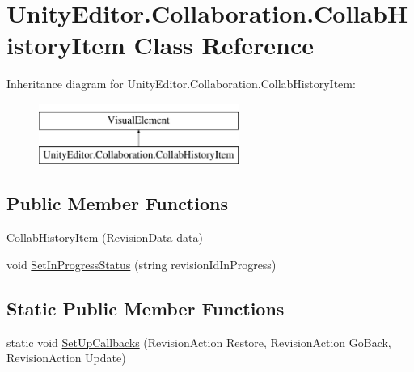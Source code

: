 \hypertarget{class_unity_editor_1_1_collaboration_1_1_collab_history_item}{}\section{Unity\+Editor.\+Collaboration.\+Collab\+History\+Item Class Reference}
\label{class_unity_editor_1_1_collaboration_1_1_collab_history_item}
Inheritance diagram for Unity\+Editor.\+Collaboration.\+Collab\+History\+Item\+:\begin{figure}[H]
\begin{center}
\leavevmode
\includegraphics[height=2.000000cm]{class_unity_editor_1_1_collaboration_1_1_collab_history_item}
\end{center}
\end{figure}
\subsection*{Public Member Functions}
\begin{DoxyCompactItemize}
\item 
\mbox{\hyperlink{class_unity_editor_1_1_collaboration_1_1_collab_history_item_a4f57052c02c99bd8d57e25fb7f33fc97}{Collab\+History\+Item}} (Revision\+Data data)
\item 
void \mbox{\hyperlink{class_unity_editor_1_1_collaboration_1_1_collab_history_item_aa341dac7ad719513071adcce064ad566}{Set\+In\+Progress\+Status}} (string revision\+Id\+In\+Progress)
\end{DoxyCompactItemize}
\subsection*{Static Public Member Functions}
\begin{DoxyCompactItemize}
\item 
static void \mbox{\hyperlink{class_unity_editor_1_1_collaboration_1_1_collab_history_item_a83f34e69f82829b893034e23379c1dc8}{Set\+Up\+Callbacks}} (Revision\+Action Restore, Revision\+Action Go\+Back, Revision\+Action Update)
\end{DoxyCompactItemize}
